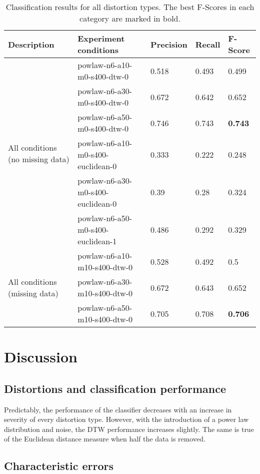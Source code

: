 \documentclass[10pt]{article}
\begin{document}
	\begin{table}[ht!]
	\centering
	\begin{tabular}{|l|l|lll|}
\hline Description & Experiment conditions & Precision & Recall & F-Score \\ \hline 
\multirow{6}{*}{All conditions (no missing data)}  
 & powlaw-n6-a10-m0-s400-dtw-0 & 0.518 & 0.493 & 0.499 \\ 
 & powlaw-n6-a30-m0-s400-dtw-0 & 0.672 & 0.642 & 0.652 \\ 
 & powlaw-n6-a50-m0-s400-dtw-0 & 0.746 & 0.743 & \textbf{0.743} \\ 
 & powlaw-n6-a10-m0-s400-euclidean-0 & 0.333 & 0.222 & 0.248 \\ 
 & powlaw-n6-a30-m0-s400-euclidean-0 & 0.39 & 0.28 & 0.324 \\ 
 & powlaw-n6-a50-m0-s400-euclidean-1 & 0.486 & 0.292 & 0.329 \\ \hline 

\multirow{3}{*}{All conditions (missing data)}
 & powlaw-n6-a10-m10-s400-dtw-0 & 0.528 & 0.492 & 0.5 \\ 
 & powlaw-n6-a30-m10-s400-dtw-0 & 0.672 & 0.643 & 0.652 \\ 
 & powlaw-n6-a50-m10-s400-dtw-0 & 0.705 & 0.708 & \textbf{0.706} \\ \hline
	\end{tabular}
	\label{tab:allresults}
	\caption{Classification results for all distortion types. The best F-Scores in each category are marked in bold.}
	\end{table}
		
	\section{Discussion}
	\subsection{Distortions and classification performance}
	Predictably, the performance of the classifier decreases with an increase in severity of every distortion type. However, with the introduction of a power law distribution and noise, the DTW performance increases slightly. The same is true of the Euclidean distance measure when half the data is removed. 
	\subsection{Characteristic errors}
\end{document}
